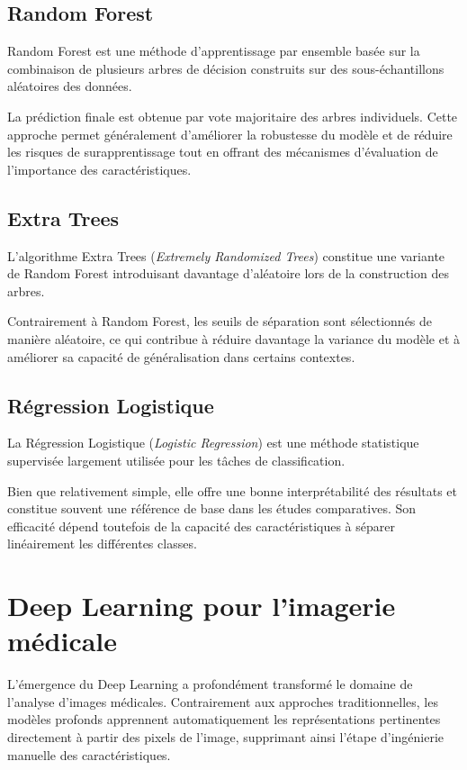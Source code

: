 \subsection{Random Forest}

Random Forest est une méthode d'apprentissage par ensemble basée sur la combinaison de
plusieurs arbres de décision construits sur des sous-échantillons aléatoires des données.

La prédiction finale est obtenue par vote majoritaire des arbres individuels. Cette approche
permet généralement d'améliorer la robustesse du modèle et de réduire les risques de
surapprentissage tout en offrant des mécanismes d'évaluation de l'importance des
caractéristiques.

\subsection{Extra Trees}

L'algorithme Extra Trees (\emph{Extremely Randomized Trees}) constitue une variante de
Random Forest introduisant davantage d'aléatoire lors de la construction des arbres.

Contrairement à Random Forest, les seuils de séparation sont sélectionnés de manière
aléatoire, ce qui contribue à réduire davantage la variance du modèle et à améliorer sa
capacité de généralisation dans certains contextes.

\subsection{Régression Logistique}

La Régression Logistique (\emph{Logistic Regression}) est une méthode statistique supervisée
largement utilisée pour les tâches de classification.

Bien que relativement simple, elle offre une bonne interprétabilité des résultats et
constitue souvent une référence de base dans les études comparatives. Son efficacité dépend
toutefois de la capacité des caractéristiques à séparer linéairement les différentes classes.

\section{Deep Learning pour l'imagerie médicale}

L'émergence du Deep Learning a profondément transformé le domaine de l'analyse d'images
médicales. Contrairement aux approches traditionnelles, les modèles profonds apprennent
automatiquement les représentations pertinentes directement à partir des pixels de l'image,
supprimant ainsi l'étape d'ingénierie manuelle des caractéristiques.

